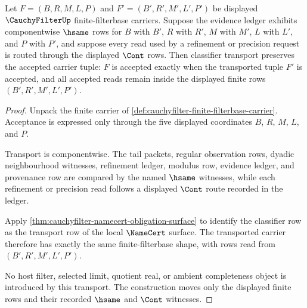 \begin{theorem}
\label{thm:cauchyfilter-carrier-transport-obligation}
Let $F=(B,R,M,L,P)$ and $F'=(B',R',M',L',P')$ be displayed
$\CauchyFilterUp$ finite-filterbase carriers. Suppose the evidence ledger
exhibits componentwise $\hsame$ rows for $B$ with $B'$, $R$ with $R'$, $M$
with $M'$, $L$ with $L'$, and $P$ with $P'$, and suppose every read used by a
refinement or precision request is routed through the displayed $\Cont$ rows.
Then classifier transport preserves the accepted carrier tuple: $F$ is
accepted exactly when the transported tuple $F'$ is accepted, and all accepted
reads remain inside the displayed finite rows $(B',R',M',L',P')$.
\end{theorem}
\begin{proof}
Unpack the finite carrier of
\autoref{def:cauchyfilter-finite-filterbase-carrier}. Acceptance is expressed
only through the five displayed coordinates $B$, $R$, $M$, $L$, and $P$.

Transport is componentwise. The tail packets, regular observation rows, dyadic
neighbourhood witnesses, refinement ledger, modulus row, evidence ledger, and
provenance row are compared by the named $\hsame$ witnesses, while each
refinement or precision read follows a displayed $\Cont$ route recorded in the
ledger.

Apply \autoref{thm:cauchyfilter-namecert-obligation-surface} to identify the
classifier row as the transport row of the local $\NameCert$ surface. The
transported carrier therefore has exactly the same finite-filterbase shape,
with rows read from $(B',R',M',L',P')$.

No host filter, selected limit, quotient real, or ambient completeness object
is introduced by this transport. The construction moves only the displayed
finite rows and their recorded $\hsame$ and $\Cont$ witnesses.
\end{proof}

